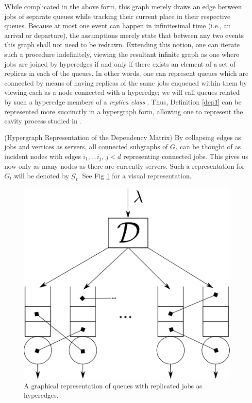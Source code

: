 While complicated in the above form, this graph merely draws an edge between jobs of separate queues while tracking their current place in their respective queues. Because at most one event can happen in infinitesimal time (i.e., an arrival or departure), the assumptions merely state that between any two events this graph shall not need to be redrawn. Extending this notion, one can iterate such a procedure indefinitely, viewing the resultant infinite graph as one where jobs are joined by hyperedges if and only if there exists an element of a set of replicas in each of the queues. In other words, one can represent queues which are connected by means of having replicas of the same jobs enqueued within them by viewing each as a node connected with a hyperedge; we will call queues related by such a hyperedge members of a \textit{replica class} . Thus, Definition \ref{dep1} can be represented more succinctly in a hypergraph form, allowing one to represent the cavity process studied in \cite{Hellemans}.

\begin{definition}(Hypergraph Representation of the Dependency Matrix)
    By collapsing edges as jobs and vertices as servers, all connected subgraphs of $G_{t}$ can be thought of as incident nodes with edges $i_{1}, \dots i_{j}$, $j<d$ representing connected jobs. This gives us now only as many nodes as there are currently servers. Such a representation for $G_{t}$ will be denoted by $\mathcal{G}_{t}$. See Fig \ref{fig:hyper} for a visual representation.
\end{definition}

\begin{figure}
    \centering
    \includegraphics[scale=0.5]{systemredun}
    \caption{A graphical representation of queues with replicated jobs as hyperedges.}
    \label{fig:hyper}
\end{figure}

